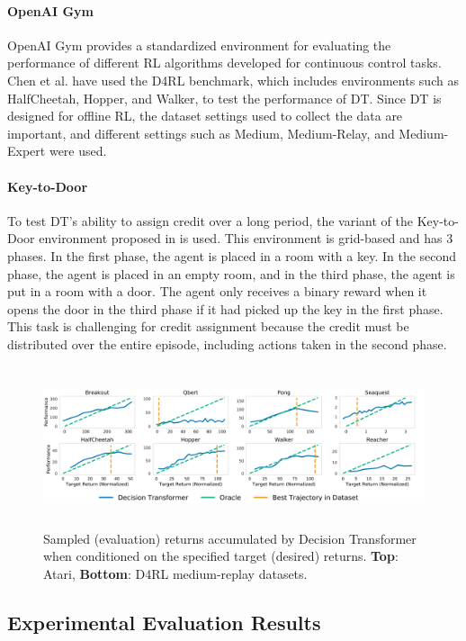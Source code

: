 \documentclass[conference]{IEEEtran}
\begin{document}
\paragraph{\textbf{OpenAI Gym}}
OpenAI Gym provides a standardized environment for evaluating the performance of different RL algorithms developed for continuous control tasks. Chen et al.\cite{b1} have used the D4RL benchmark\cite{b17}, which includes environments such as HalfCheetah, Hopper, and Walker, to test the performance of DT. Since DT is designed for offline RL, the dataset settings used to collect the data are important, and different settings such as Medium, Medium-Relay, and Medium-Expert were used.

\paragraph{\textbf{Key-to-Door}}
To test DT's ability to assign credit over a long period, the variant of the Key-to-Door environment proposed in\cite{b15} is used. This environment is grid-based and has 3 phases. In the first phase, the agent is placed in a room with a key. In the second phase, the agent is placed in an empty room, and in the third phase, the agent is put in a room with a door. The agent only receives a binary reward when it opens the door in the third phase if it had picked up the key in the first phase. This task is challenging for credit assignment because the credit must be distributed over the entire episode, including actions taken in the second phase.

\begin{figure}
  \includegraphics[width=\textwidth, height=4.7cm]{Images/result.png}
  \caption{Sampled (evaluation) returns accumulated by Decision Transformer when conditioned on the specified target (desired) returns. \textbf{Top}: Atari, \textbf{Bottom}: D4RL medium-replay datasets\cite{b1}.}
\end{figure}
\subsection{Experimental Evaluation Results}
\end{document}
